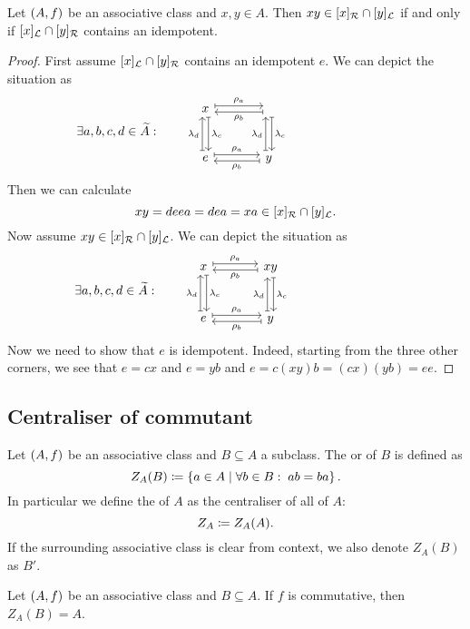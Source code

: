 \begin{proposition}
Let $\left( A, f \right)$ be an associative class and $x,y\in A$. Then $xy\in [x]_{\mathcal{R}} \cap [y]_{\mathcal{L}}$ \textup{if and only if} $[x]_{\mathcal{L}} \cap [y]_{\mathcal{R}}$ contains an idempotent.
\end{proposition}
\begin{proof}
First assume $[x]_{\mathcal{L}} \cap [y]_{\mathcal{R}}$ contains an idempotent $e$. We can depict the situation as
\[ \hspace{-8.4em} \exists a,b,c,d \in \widetilde{A}: \qquad \begin{tikzcd}[sep=large]
x \ar[r, maps to, shift left, "\rho_a"] \ar[d, maps to, shift left, "\lambda_c"] &  \ar[l, maps to, shift left, "\rho_b"] \ar[d, maps to, shift left, "\lambda_c"] \\
e \ar[u, maps to, shift left, "\lambda_d"] \ar[r, maps to, shift left, "\rho_a"] & y \ar[u, maps to, shift left, "\lambda_d"] \ar[l, maps to, shift left, "\rho_b"]
\end{tikzcd} \]
Then we can calculate
\[ xy = deea = dea = xa \in [x]_{\mathcal{R}} \cap [y]_{\mathcal{L}}. \]
Now assume $xy\in [x]_{\mathcal{R}} \cap [y]_{\mathcal{L}}$.
We can depict the situation as
\[ \hspace{-8.4em} \exists a,b,c,d \in \widetilde{A}: \qquad \begin{tikzcd}[sep=large]
x \ar[r, maps to, shift left, "\rho_a"] \ar[d, maps to, shift left, "\lambda_c"] & xy \ar[l, maps to, shift left, "\rho_b"] \ar[d, maps to, shift left, "\lambda_c"] \\
e \ar[u, maps to, shift left, "\lambda_d"] \ar[r, maps to, shift left, "\rho_a"] & y \ar[u, maps to, shift left, "\lambda_d"] \ar[l, maps to, shift left, "\rho_b"]
\end{tikzcd} \]
Now we need to show that $e$ is idempotent. Indeed, starting from the three other corners, we see that $e = cx$ and $e = yb$ and $e = c(xy)b = (cx)(yb) = ee$.
\end{proof}

\subsection{Centraliser of commutant}
\begin{definition}
Let $\left( A,f \right)$ be an associative class and $B\subseteq A$ a subclass. The  or  of $B$ is defined as
\[ Z_A(B) \coloneqq \left\{ a\in A \;\middle|\; \forall b\in B:\;ab = ba \right\}. \]
In particular we define the  of $A$ as the centraliser of all of $A$:
\[ Z_A \coloneqq Z_A(A). \]
If the surrounding associative class is clear from context, we also denote $Z_A(B)$ as $B'$.
\end{definition}
\begin{lemma}
Let $\left( A,f \right)$ be an associative class and $B\subseteq A$. If $f$ is commutative, then $Z_A(B) = A$.
\end{lemma}

